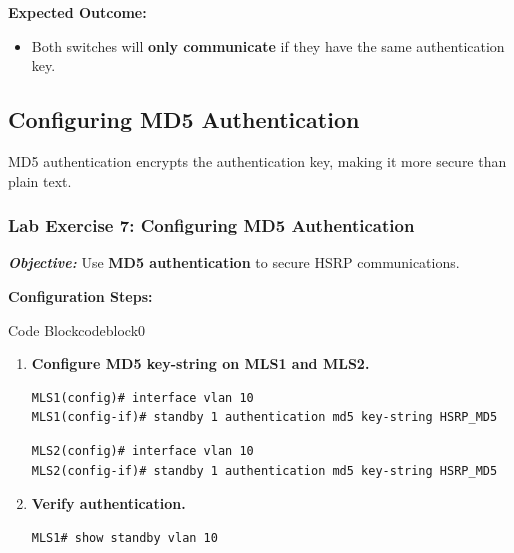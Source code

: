 \documentclass[a4paper]{book}
\begin{document}
\textbf{Expected Outcome:}
\begin{itemize}
\item Both switches will \textbf{only communicate} if they have the same authentication key.
\end{itemize}

\subsection{Configuring MD5 Authentication}
MD5 authentication encrypts the authentication key, making it more secure than plain text.

\subsubsection{Lab Exercise 7: Configuring MD5 Authentication}
\textbf{\textit{Objective:}} Use \textbf{MD5 authentication} to secure HSRP communications.

\vspace{1.5em}

\textbf{Configuration Steps:}


\vspace{1.5em}


\begin{ocg}{Code Block}{codeblock}{0}


\vspace{0.5cm}
\begin{enumerate}
\item \textbf{Configure MD5 key-string on MLS1 and MLS2.}
\begin{lstlisting}
MLS1(config)# interface vlan 10
MLS1(config-if)# standby 1 authentication md5 key-string HSRP_MD5
\end{lstlisting}
\begin{lstlisting}
MLS2(config)# interface vlan 10
MLS2(config-if)# standby 1 authentication md5 key-string HSRP_MD5
\end{lstlisting}

\item \textbf{Verify authentication.}
\begin{lstlisting}
MLS1# show standby vlan 10
\end{lstlisting}
\end{enumerate}
\end{ocg}
\end{document}
